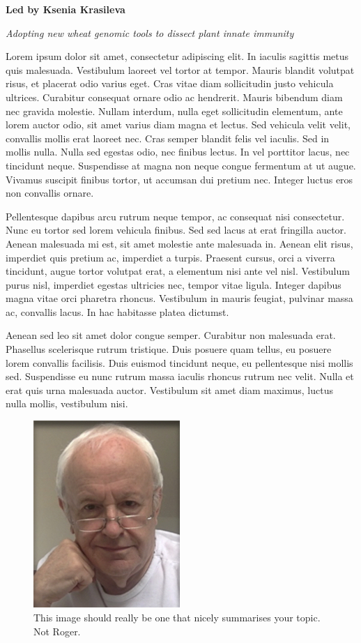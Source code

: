 \documentclass[12pt,]{book}
\begin{document}
\textbf{Led by Ksenia Krasileva}

\emph{Adopting new wheat genomic tools to dissect plant innate immunity}

Lorem ipsum dolor sit amet, consectetur adipiscing elit. In iaculis
sagittis metus quis malesuada. Vestibulum laoreet vel tortor at tempor.
Mauris blandit volutpat risus, et placerat odio varius eget. Cras vitae
diam sollicitudin justo vehicula ultrices. Curabitur consequat ornare
odio ac hendrerit. Mauris bibendum diam nec gravida molestie. Nullam
interdum, nulla eget sollicitudin elementum, ante lorem auctor odio, sit
amet varius diam magna et lectus. Sed vehicula velit velit, convallis
mollis erat laoreet nec. Cras semper blandit felis vel iaculis. Sed in
mollis nulla. Nulla sed egestas odio, nec finibus lectus. In vel
porttitor lacus, nec tincidunt neque. Suspendisse at magna non neque
congue fermentum at ut augue. Vivamus suscipit finibus tortor, ut
accumsan dui pretium nec. Integer luctus eros non convallis ornare.

Pellentesque dapibus arcu rutrum neque tempor, ac consequat nisi
consectetur. Nunc eu tortor sed lorem vehicula finibus. Sed sed lacus at
erat fringilla auctor. Aenean malesuada mi est, sit amet molestie ante
malesuada in. Aenean elit risus, imperdiet quis pretium ac, imperdiet a
turpis. Praesent cursus, orci a viverra tincidunt, augue tortor volutpat
erat, a elementum nisi ante vel nisl. Vestibulum purus nisl, imperdiet
egestas ultricies nec, tempor vitae ligula. Integer dapibus magna vitae
orci pharetra rhoncus. Vestibulum in mauris feugiat, pulvinar massa ac,
convallis lacus. In hac habitasse platea dictumst.

Aenean sed leo sit amet dolor congue semper. Curabitur non malesuada
erat. Phasellus scelerisque rutrum tristique. Duis posuere quam tellus,
eu posuere lorem convallis facilisis. Duis euismod tincidunt neque, eu
pellentesque nisi mollis sed. Suspendisse eu nunc rutrum massa iaculis
rhoncus rutrum nec velit. Nulla et erat quis urna malesuada auctor.
Vestibulum sit amet diam maximus, luctus nulla mollis, vestibulum nisi.

\begin{figure}
\includegraphics[width=2.19in]{assets/RPF-thumbnail} \caption{This image should really be one that nicely summarises your topic. Not Roger.}\label{fig:mainwg}
\end{figure}
\end{document}
